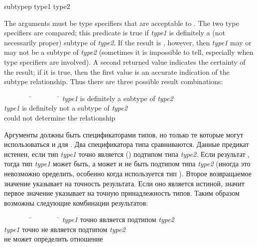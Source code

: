 \begin{defun}[Function]
subtypep type1 type2

The arguments must be type specifiers that are acceptable to .
The two type specifiers are compared; this predicate is true
if \emph{type1} is definitely a (not necessarily proper) subtype of \emph{type2}.
If the result is {\false}, however, then \emph{type1} may or may not be a subtype of
\emph{type2} (sometimes it is impossible to tell, especially when
 type specifiers are involved).
A second returned value indicates the certainty of the result;
if it is true, then the first value is an accurate indication
of the subtype relationship.  Thus there are three possible
result combinations:
\begin{tabbing}
~~~~~~~~\=~~~~~~~~\=\kill
{\true}\>{\true}\>\emph{type1} is definitely a subtype of \emph{type2} \\
{\false}\>{\true}\>\emph{type1} is definitely not a subtype of \emph{type2} \\
{\false}\>{\false}\> could not determine the relationship
\end{tabbing}

Аргументы должны быть спецификаторами типов, но только те которые могут
использоваться и для .
Два спецификатора типа сравниваются. Данные предикат истенен, если
тип \emph{type1} точно является () подтипом типа \emph{type2}.
Если результат {\false}, тогда тип \emph{type1} может быть, а может и не быть
подтипом типа \emph{type2} (иногда это невозможно оределить, особенно когда
используется тип ).
Второе возвращаемое значение указывает на точность результата. Если оно является
истиной, значит первое значение указывает на точную принадлежность типов. Таким
образом возможны следующие комбинации результатов:
\begin{tabbing}
~~~~~~~~\=~~~~~~~~\=\kill
{\true}\>{\true}\>\emph{type1} точно является подтипом \emph{type2} \\
{\false}\>{\true}\>\emph{type1} точно не является подтипом \emph{type2} \\
{\false}\>{\false}\> не может определить отношение
\end{tabbing}


\end{defun}

